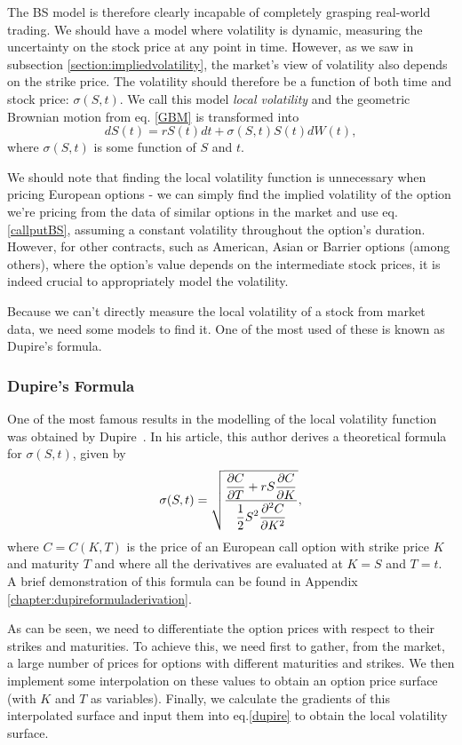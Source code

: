 The BS model is therefore clearly incapable of completely grasping real-world trading. We should have a model where volatility is dynamic, measuring the uncertainty on the stock price at any point in time.
However, as we saw in subsection \ref{section:impliedvolatility}, the market's view of volatility also depends on the strike price.
The volatility should therefore be a function of both time and stock price: $\sigma(S,t)$. We call this model \emph{local volatility} and the geometric Brownian motion from eq. \ref{GBM} is transformed into
\begin{equation}\label{GBM2}
dS(t)=rS(t)dt+\sigma(S,t)S(t)dW(t),
\end{equation}
\noindent where $\sigma(S,t)$ is some function of $S$ and $t$.


We should note that finding the local volatility function is unnecessary when pricing European options - we can simply find the implied volatility of the option we're pricing from the data of similar options in the market and use eq.\eqref{callputBS}, assuming a constant volatility throughout the option's duration.
However, for other contracts, such as American, Asian or Barrier options (among others), where the option's value depends on the intermediate stock prices, it is indeed crucial to appropriately model the volatility.

Because we can't directly measure the local volatility of a stock from market data, we need some models to find it. One of the most used of these is known as Dupire's formula.

\subsubsection{Dupire's Formula}
\label{subsubsection:Dupire}
One of the most famous results in the modelling of the local volatility function was obtained by Dupire~\cite{Dupire}. In his article, this author derives a theoretical formula for $\sigma(S,t)$, given by
\begin{equation}\label{dupire}
\sigma(S,t)=\sqrt{\frac{\displaystyle\pdv{C}{T}+rS\pdv{C}{K}}{\displaystyle\frac{1}{2}S^2\pdv{^2C}{K^2}}},
\end{equation}
\noindent where $C=C(K,T)$ is the price of an European call option with strike price $K$ and maturity $T$ and where all the derivatives are evaluated at $K=S$ and $T=t$.
A brief demonstration of this formula can be found in Appendix \ref{chapter:dupireformuladerivation}.

As can be seen, we need to differentiate the option prices with respect to their strikes and maturities. To achieve this, we need first to gather, from the market, a large number of prices for options with different maturities and strikes. We then implement some interpolation on these values to obtain an option price surface (with $K$ and $T$ as variables). Finally, we calculate the gradients of this interpolated surface and input them into eq.\eqref{dupire} to obtain the local volatility surface.

